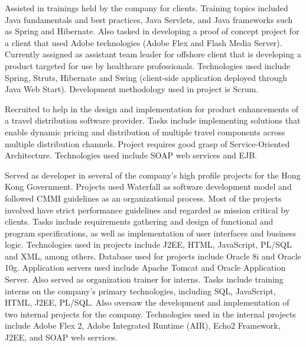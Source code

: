 \documentclass[10.5pt]{article}
\begin{document}
\begin{longtext}
Assisted in trainings held by the company for clients. Training topics included Java fundamentals
and best practices, Java Servlets, and Java frameworks such as Spring and Hibernate. Also tasked
in developing a proof of concept project for a client that used Adobe technologies (Adobe Flex
and Flash Media Server).
\shortskip
Currently assigned as assistant team leader for offshore client that is developing a product targeted for use
by healthcare professionals. Technologies used include Spring, Struts, Hibernate and Swing
(client-side application deployed through Java Web Start). Development methodology used in
project is Scrum.\\
\end{longtext}
\begin{longtext}
Recruited to help in the design and implementation for product enhancements of a travel
distribution software provider. Tasks include implementing solutions that enable dynamic pricing
and distribution of multiple travel components across multiple distribution channels. Project
requires good grasp of Service-Oriented Architecture. Technologies used include SOAP web
services and EJB.\\
\end{longtext}
\begin{longtext}
Served as developer in several of the company's high profile projects for the Hong Kong
Government. Projects used Waterfall as software development model and followed CMMI
guidelines as an organizational process. Most of the projects involved have strict performance
guidelines and regarded as mission critical by clients. Tasks include requirements gathering and
design of functional and program specifications, as well as implementation of user interfaces and
business logic. Technologies used in projects include J2EE, HTML, JavaScript, PL/SQL and
XML, among others. Database used for projects include Oracle 8i and Oracle 10g. Application
servers used include Apache Tomcat and Oracle Application Server.
\shortskip
Also served as organization trainer for interns. Tasks include training interns on the company's
primary technologies, including SQL, JavaScript, HTML, J2EE, PL/SQL. Also oversaw the development and implementation of two internal projects for the company. Technologies used in the internal projects include Adobe Flex 2, Adobe Integrated Runtime (AIR), Echo2 Framework,
J2EE, and SOAP web services.\\
\end{longtext}
\end{document}
